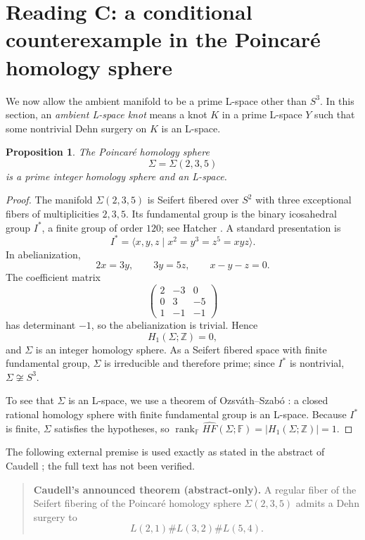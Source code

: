 \documentclass[12pt]{article}
\newtheorem{proposition}[theorem]{Proposition}
\theoremstyle{definition}
\newcommand{\Z}{\mathbb Z}
\newcommand{\F}{\mathbb F}
\newcommand{\HFhat}{\widehat{HF}}
\DeclareMathOperator{\rank}{rank}
\begin{document}
\section{Reading C: a conditional counterexample in the Poincaré homology sphere}
\label{sec:readingC}

We now allow the ambient manifold to be a prime L-space other than \(S^3\).  In this section, an \emph{ambient L-space knot} means a knot \(K\) in a prime L-space \(Y\) such that some nontrivial Dehn surgery on \(K\) is an L-space.

\begin{proposition}\label{prop:poincare-lspace}
The Poincaré homology sphere
\[
\Sigma=\Sigma(2,3,5)
\]
is a prime integer homology sphere and an L-space.
\end{proposition}

\begin{proof}
The manifold \(\Sigma(2,3,5)\) is Seifert fibered over \(S^2\) with three exceptional fibers of multiplicities \(2,3,5\).  Its fundamental group is the binary icosahedral group \(I^*\), a finite group of order \(120\); see Hatcher \cite{Hatcher}.  A standard presentation is
\[
I^*=\langle x,y,z \mid x^2=y^3=z^5=xyz\rangle.
\]
In abelianization,
\[
2x=3y,\qquad 3y=5z,\qquad x-y-z=0.
\]
The coefficient matrix
\[
\begin{pmatrix}
2 & -3 & 0\\
0 & 3 & -5\\
1 & -1 & -1
\end{pmatrix}
\]
has determinant \(-1\), so the abelianization is trivial.  Hence
\[
H_1(\Sigma;\Z)=0,
\]
and \(\Sigma\) is an integer homology sphere.  As a Seifert fibered space with finite fundamental group, \(\Sigma\) is irreducible and therefore prime; since \(I^*\) is nontrivial, \(\Sigma\not\cong S^3\).

To see that \(\Sigma\) is an L-space, we use a theorem of Ozsváth--Szabó \cite{OSz}: a closed rational homology sphere with finite fundamental group is an L-space.  Because \(I^*\) is finite, \(\Sigma\) satisfies the hypotheses, so \(\rank_{\F}\HFhat(\Sigma;\F)=|H_1(\Sigma;\Z)|=1\).
\end{proof}

The following external premise is used exactly as stated in the abstract of Caudell \cite{Caudell}; the full text has not been verified.

\begin{quote}
\textbf{Caudell's announced theorem (abstract-only).} A regular fiber of the Seifert fibering of the Poincaré homology sphere \(\Sigma(2,3,5)\) admits a Dehn surgery to
\[
L(2,1)\# L(3,2)\# L(5,4).
\]
\end{quote}
\end{document}
